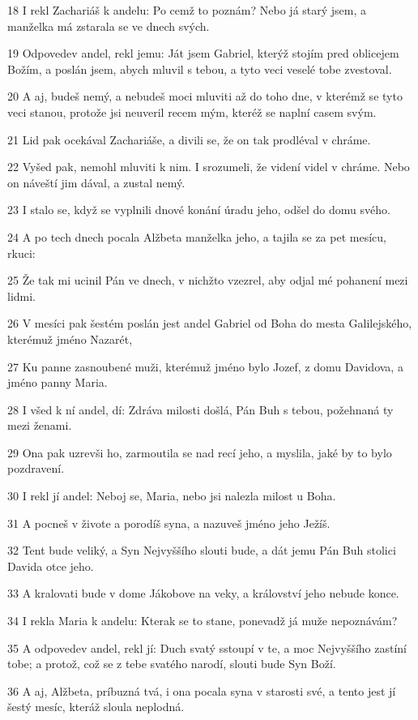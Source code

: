 \par 18 I rekl Zachariáš k andelu: Po cemž to poznám? Nebo já starý jsem, a manželka má zstarala se ve dnech svých.
\par 19 Odpovedev andel, rekl jemu: Ját jsem Gabriel, kterýž stojím pred oblicejem Božím, a poslán jsem, abych mluvil s tebou, a tyto veci veselé tobe zvestoval.
\par 20 A aj, budeš nemý, a nebudeš moci mluviti až do toho dne, v kterémž se tyto veci stanou, protože jsi neuveril recem mým, kteréž se naplní casem svým.
\par 21 Lid pak ocekával Zachariáše, a divili se, že on tak prodléval v chráme.
\par 22 Vyšed pak, nemohl mluviti k nim. I srozumeli, že videní videl v chráme. Nebo on náveští jim dával, a zustal nemý.
\par 23 I stalo se, když se vyplnili dnové konání úradu jeho, odšel do domu svého.
\par 24 A po tech dnech pocala Alžbeta manželka jeho, a tajila se za pet mesícu, rkuci:
\par 25 Že tak mi ucinil Pán ve dnech, v nichžto vzezrel, aby odjal mé pohanení mezi lidmi.
\par 26 V mesíci pak šestém poslán jest andel Gabriel od Boha do mesta Galilejského, kterémuž jméno Nazarét,
\par 27 Ku panne zasnoubené muži, kterémuž jméno bylo Jozef, z domu Davidova, a jméno panny Maria.
\par 28 I všed k ní andel, dí: Zdráva milosti došlá, Pán Buh s tebou, požehnaná ty mezi ženami.
\par 29 Ona pak uzrevši ho, zarmoutila se nad recí jeho, a myslila, jaké by to bylo pozdravení.
\par 30 I rekl jí andel: Neboj se, Maria, nebo jsi nalezla milost u Boha.
\par 31 A pocneš v živote a porodíš syna, a nazuveš jméno jeho Ježíš.
\par 32 Tent bude veliký, a Syn Nejvyššího slouti bude, a dát jemu Pán Buh stolici Davida otce jeho.
\par 33 A kralovati bude v dome Jákobove na veky, a království jeho nebude konce.
\par 34 I rekla Maria k andelu: Kterak se to stane, ponevadž já muže nepoznávám?
\par 35 A odpovedev andel, rekl jí: Duch svatý sstoupí v te, a moc Nejvyššího zastíní tobe; a protož, což se z tebe svatého narodí, slouti bude Syn Boží.
\par 36 A aj, Alžbeta, príbuzná tvá, i ona pocala syna v starosti své, a tento jest jí šestý mesíc, kteráž sloula neplodná.
